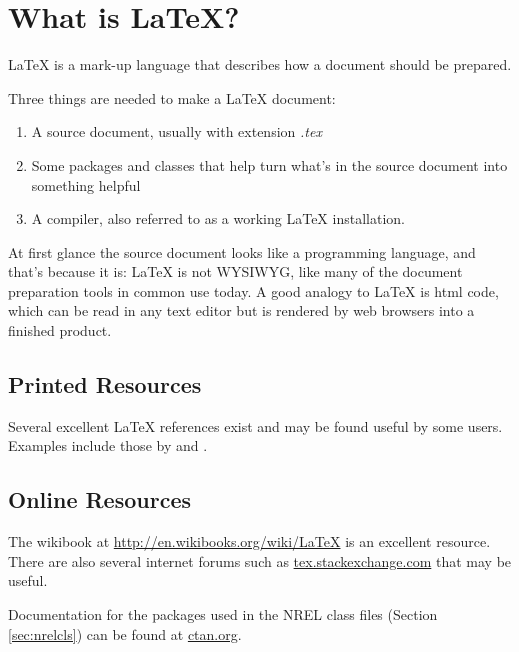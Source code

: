 \section{What is LaTeX?}
LaTeX is a mark-up language that describes how a document should be prepared.

Three things are needed to make a LaTeX document:
\begin{enumerate}
\item A source document, usually with extension \emph{.tex}
\item Some packages and classes that help turn what's in the source document into something helpful
\item A compiler, also referred to as a working LaTeX installation.
\end{enumerate}

At first glance the source document looks like a programming language, and that's because it is: LaTeX is not WYSIWYG, like many of the document preparation tools in common use today. A good analogy to LaTeX is html code, which can be read in any text editor but is rendered by web browsers into a finished product.

\subsection{Printed Resources}
Several excellent LaTeX references exist and may be found useful by some users. Examples include those by \citet{Knuth_1984_a} and \citet{Lamport_1986_a}.

\subsection{Online Resources}
The wikibook at \href{http://en.wikibooks.org/wiki/LaTeX}{http://en.wikibooks.org/wiki/LaTeX} is an excellent resource. There are also several internet forums such as \href{tex.stackexchange.com}{tex.stackexchange.com} that may be useful.

Documentation for the packages used in the NREL class files (Section \ref{sec:nrelcls}) can be found at \href{ctan.org}{ctan.org}.
